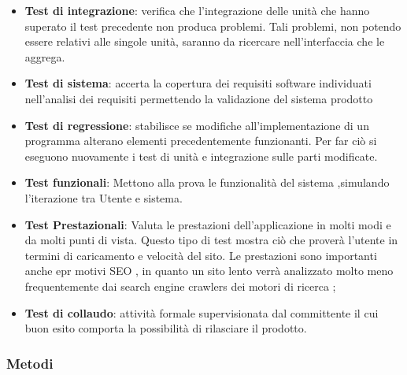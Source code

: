 \begin{itemize}
\begin{itemize}
\item \textbf{Test di integrazione}:
verifica che l'integrazione delle unità che hanno superato il test precedente non produca problemi. Tali problemi, non potendo essere relativi alle singole unità, saranno da ricercare nell'interfaccia che le aggrega.
\item \textbf{Test di sistema}:
accerta la copertura dei requisiti software individuati nell'analisi dei requisiti permettendo la validazione del sistema prodotto

\item \textbf{Test di regressione}:
stabilisce se modifiche all'implementazione di un programma alterano elementi precedentemente funzionanti. Per far ciò si eseguono nuovamente i test di unità e integrazione sulle parti modificate.

\item \textbf{Test funzionali}:
Mettono alla prova le funzionalità del sistema ,simulando l'iterazione tra Utente e sistema.

\item \textbf{Test Prestazionali}:
Valuta le prestazioni dell'applicazione in molti modi e da molti punti di vista. Questo tipo di test mostra ciò che proverà l'utente in termini di caricamento e velocità del sito. Le prestazioni sono importanti anche epr motivi SEO , in quanto un sito lento verrà analizzato molto meno frequentemente dai search engine crawlers dei motori di ricerca ;

\item \textbf{Test di collaudo}:
attività formale supervisionata dal committente il cui buon esito comporta la possibilità di rilasciare il prodotto.
\end{itemize}
\end{itemize}
\subsubsection{Metodi}

